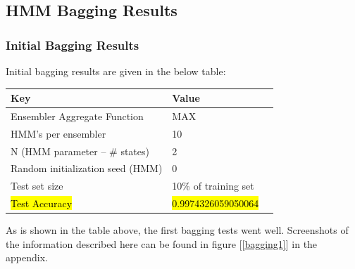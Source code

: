 \documentclass[12pt]{article}
\begin{document}
\subsection{HMM Bagging Results}
  \subsubsection{Initial Bagging Results}
  Initial bagging results are given in the below table:
  \begin{table}[H]
    \centering
  \begin{tabular}{|l|l|l|}
    \hline \textbf{Key} & \textbf{Value} \\\hline \hline
    Ensembler Aggregate Function & \textsc{MAX}  \\ \hline
    HMM's per ensembler & 10 \\ \hline
    N (HMM parameter -- \# states) & 2 \\ \hline
    Random initialization seed (HMM) & 0 \\ \hline
    Test set size  & 10\% of training set \\ \hline
  \hl{Test Accuracy} & \hl{0.9974326059050064}  \\ \hline
  \end{tabular}
  \end{table}
  As is shown in the table above, the first bagging tests went well. Screenshots of the information described here can be found in figure [\ref{bagging1}] in the appendix.
\end{document}
